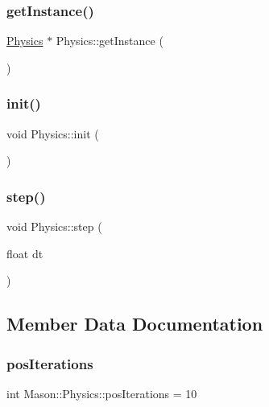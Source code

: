 \subsubsection{\texorpdfstring{get\+Instance()}{getInstance()}}
{\footnotesize\ttfamily \hyperlink{class_mason_1_1_physics}{Physics} $\ast$ Physics\+::get\+Instance (\begin{DoxyParamCaption}{ }\end{DoxyParamCaption})\hspace{0.3cm}{\ttfamily [static]}}

\hypertarget{class_mason_1_1_physics_abc4560255c493a7fd543dd6730e4f826}{}\label{class_mason_1_1_physics_abc4560255c493a7fd543dd6730e4f826} 
\subsubsection{\texorpdfstring{init()}{init()}}
{\footnotesize\ttfamily void Physics\+::init (\begin{DoxyParamCaption}{ }\end{DoxyParamCaption})}

\hypertarget{class_mason_1_1_physics_ad625f1dea595f7b723003d54f997a518}{}\label{class_mason_1_1_physics_ad625f1dea595f7b723003d54f997a518} 
\subsubsection{\texorpdfstring{step()}{step()}}
{\footnotesize\ttfamily void Physics\+::step (\begin{DoxyParamCaption}\item[{float}]{dt }\end{DoxyParamCaption})}



\subsection{Member Data Documentation}
\hypertarget{class_mason_1_1_physics_a43a4f23b2ee62ad20c3ed54a7c75a468}{}\label{class_mason_1_1_physics_a43a4f23b2ee62ad20c3ed54a7c75a468} 
\subsubsection{\texorpdfstring{pos\+Iterations}{posIterations}}
{\footnotesize\ttfamily int Mason\+::\+Physics\+::pos\+Iterations = 10}

